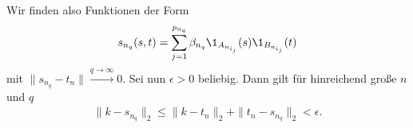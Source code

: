 \begin{solution}
\begin{enumerate}[label = (\alph*)]
Wir finden also Funktionen der Form
\begin{align}
    s_{n_q} (s,t) = \sum_{j=1}^{p_{n_q}} \beta_{n_q} \1_{A_{n_{i_j}}}(s) \1_{B_{n_{i_j}}}(t)
\end{align}
mit $\|s_{n_q} - t_n\| \xrightarrow{q \rightarrow \infty} 0.$
Sei nun $\epsilon > 0$ beliebig. Dann gilt für hinreichend große $n$ und $q$
\begin{align}
    \| k-s_{n_q} \|_2 \leq \|k - t_n\|_2 + \|t_n - s_{n_q}\|_2 < \epsilon.
\end{align}

\end{enumerate}

\end{solution}
